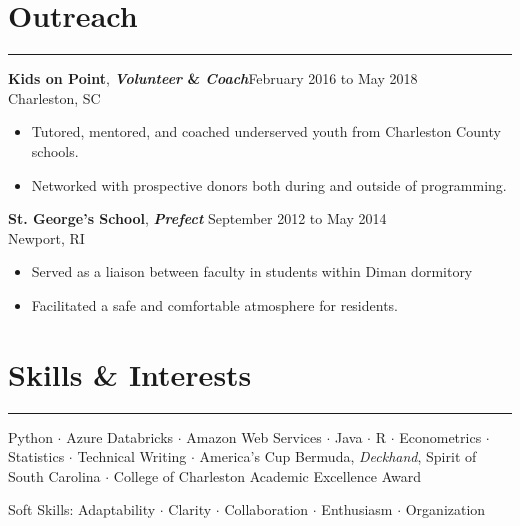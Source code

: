 \documentclass[11pt]{article}
\newcommand{\resumesection}[1]{\vspace{-0.7cm}\section*{#1}\vspace{-0.2cm}\hrule\vspace{0.2cm}}
\begin{document}
\resumesection{Outreach}
\textbf{Kids on Point}, \textbf{\textit{Volunteer} \& \textit{Coach}}\hfill February 2016 to May 2018\\
 Charleston, SC
\begin{itemize}
	\item Tutored, mentored, and coached underserved youth from Charleston County schools.
	\item Networked with prospective donors both during and outside of programming.\\
\end{itemize}
\textbf{St. George's School}, \textbf{\textit{Prefect}} \hfill September 2012 to May 2014\\Newport, RI
\begin{itemize}
	\item Served as a liaison between faculty in students within Diman dormitory
	\item Facilitated a safe and comfortable atmosphere for residents.\\
\end{itemize}
\resumesection{Skills  \& Interests}
\setlength\parindent{0cm}\normalfont Python $\cdot$ Azure Databricks $\cdot$ Amazon Web Services $\cdot$ Java $\cdot$ R $\cdot$ Econometrics $\cdot$ Statistics  $\cdot$ Technical Writing $\cdot$ America's Cup Bermuda, \textit{Deckhand}, Spirit of South Carolina $\cdot$ College of Charleston Academic Excellence Award\\
\centerline{Soft Skills: Adaptability $\cdot$ Clarity $\cdot$ Collaboration $\cdot$ Enthusiasm $\cdot$ Organization}
\end{document}
